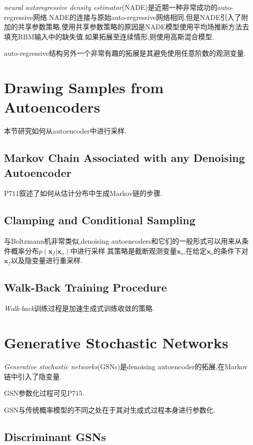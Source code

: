 \textit{neural autoregressive density estimator}(NADE)是近期一种非常成功的auto-regressive网络.NADE的连接与原始auto-regressive网络相同,但是NADE引入了附加的共享参数策略.使用共享参数策略的原因是NADE模型使用平均场推断方法去填充RBM输入中的缺失值.如果拓展至连续情形,则使用高斯混合模型.

auto-regressive结构另外一个非常有趣的拓展是其避免使用任意阶数的观测变量.

\section{Drawing Samples from Autoencoders}

本节研究如何从autoencoder中进行采样.

\subsection{Markov Chain Associated with any Denoising Autoencoder}

P$711$叙述了如何从估计分布中生成Markov链的步骤.

\subsection{Clamping and Conditional Sampling}

与Boltzmann机非常类似,denoising autoencoders和它们的一般形式可以用来从条件概率分布$p(\mathbf x_f|\mathbf x_o)$中进行采样.其策略是截断观测变量$\mathbf x_o$,在给定$\mathbf x_o$的条件下对$\mathbf x_f$以及隐变量进行重采样.

\subsection{Walk-Back Training Procedure}

\textit{Walk-back}训练过程是加速生成式训练收敛的策略.

\section{Generative Stochastic Networks}

\textit{Generative stochastic networks}(GSNs)是denoising autoencoder的拓展,在Markov链中引入了隐变量.

GSN参数化过程可见P$715$.

GSN与传统概率模型的不同之处在于其对生成式过程本身进行参数化.

\subsection{Discriminant GSNs}

